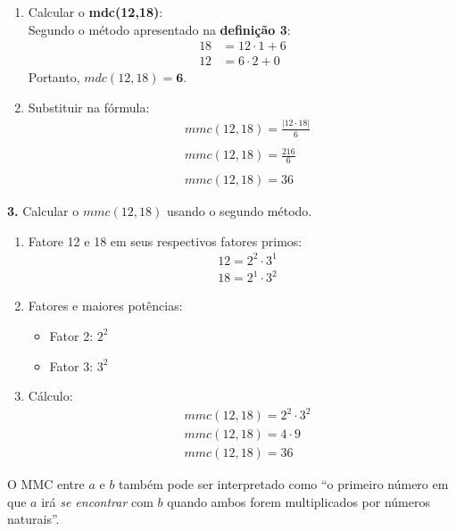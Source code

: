 \begin{enumerate}
    \item Calcular o \textbf{mdc(12,18)}:\\
          Segundo o método apresentado na \textbf{definição 3}:
          \begin{align}
              18 & = 12 \cdot 1 + 6 \tag{1} \\
              12 & = 6 \cdot 2 + 0 \tag{2}
          \end{align}
          Portanto, $mdc(12,18) = \mathbf{6}$.
    \item Substituir na fórmula:\\
          \begin{align*}
               & mmc(12,18) = \frac{|12 \cdot 18|}{6} \\
              \\
               & mmc(12,18) = \frac{216}{6}           \\
              \\
               & mmc(12,18) = 36
          \end{align*}
\end{enumerate}
\textbf{3.} Calcular o $mmc(12,18)$ usando o segundo método.

\begin{enumerate}
    \item Fatore 12 e 18 em seus respectivos fatores primos:
          \begin{align*}
               & 12 = 2^2 \cdot 3^1 \\
               & 18 = 2^1 \cdot 3^2
          \end{align*}
    \item Fatores e maiores potências:
          \begin{itemize}
              \item Fator 2: $2^2$
              \item Fator 3: $3^2$
          \end{itemize}
    \item Cálculo:
          \begin{align*}
               & mmc(12,18) = 2^2 \cdot 3^2 \\
               & mmc(12,18) = 4 \cdot 9     \\
               & mmc(12,18) = 36
          \end{align*}
\end{enumerate}

O MMC entre $a$ e $b$ também pode ser interpretado como ``o primeiro número em que $a$ irá \textit{se encontrar} com $b$ quando ambos forem multiplicados por números naturais''.
